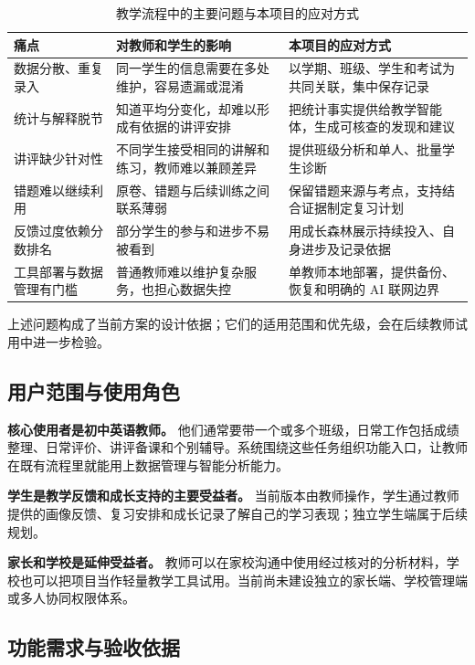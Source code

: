 \documentclass[11pt,a4paper,fontset=none]{ctexart}
\begin{document}
\begin{table}[htbp]
\centering
\small
\begin{tabularx}{\textwidth}{@{}L{3.1cm}YY@{}}
\toprule
\textbf{痛点} & \textbf{对教师和学生的影响} & \textbf{本项目的应对方式} \\
\midrule
数据分散、重复录入 & 同一学生的信息需要在多处维护，容易遗漏或混淆 & 以学期、班级、学生和考试为共同关联，集中保存记录 \\
统计与解释脱节 & 知道平均分变化，却难以形成有依据的讲评安排 & 把统计事实提供给教学智能体，生成可核查的发现和建议 \\
讲评缺少针对性 & 不同学生接受相同的讲解和练习，教师难以兼顾差异 & 提供班级分析和单人、批量学生诊断 \\
错题难以继续利用 & 原卷、错题与后续训练之间联系薄弱 & 保留错题来源与考点，支持结合证据制定复习计划 \\
反馈过度依赖分数排名 & 部分学生的参与和进步不易被看到 & 用成长森林展示持续投入、自身进步及记录依据 \\
工具部署与数据管理有门槛 & 普通教师难以维护复杂服务，也担心数据失控 & 单教师本地部署，提供备份、恢复和明确的 AI 联网边界 \\
\bottomrule
\end{tabularx}
\caption{教学流程中的主要问题与本项目的应对方式}
\end{table}

上述问题构成了当前方案的设计依据；它们的适用范围和优先级，会在后续教师试用中进一步检验。

\subsection{用户范围与使用角色}

\textbf{核心使用者是初中英语教师。} 他们通常要带一个或多个班级，日常工作包括成绩整理、日常评价、讲评备课和个别辅导。系统围绕这些任务组织功能入口，让教师在既有流程里就能用上数据管理与智能分析能力。

\textbf{学生是教学反馈和成长支持的主要受益者。} 当前版本由教师操作，学生通过教师提供的画像反馈、复习安排和成长记录了解自己的学习表现；独立学生端属于后续规划。

\textbf{家长和学校是延伸受益者。} 教师可以在家校沟通中使用经过核对的分析材料，学校也可以把项目当作轻量教学工具试用。当前尚未建设独立的家长端、学校管理端或多人协同权限体系。

\subsection{功能需求与验收依据}
\end{document}
